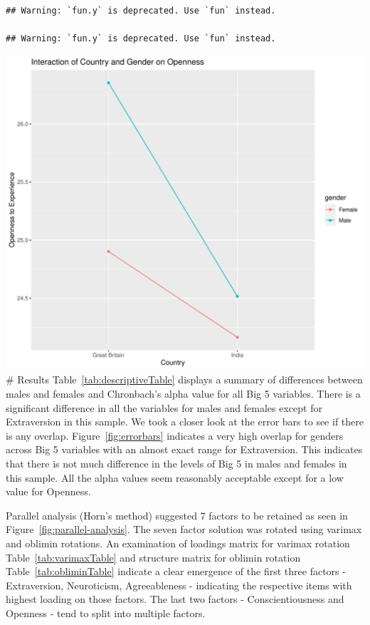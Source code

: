 \documentclass[
  english,
  man]{apa6}
\begin{document}
\begin{verbatim}
## Warning: `fun.y` is deprecated. Use `fun` instead.

## Warning: `fun.y` is deprecated. Use `fun` instead.
\end{verbatim}

\includegraphics{final_project_files/figure-latex/interaction_plot-1.pdf}
\# Results
Table~\ref{tab:descriptiveTable} displays a summary of differences between males and females and Chronbach's alpha value for all Big 5 variables. There is a significant difference in all the variables for males and females except for Extraversion in this sample. We took a closer look at the error bars to see if there is any overlap. Figure~\ref{fig:errorbars} indicates a very high overlap for genders across Big 5 variables with an almost exact range for Extraversion. This indicates that there is not much difference in the levels of Big 5 in males and females in this sample. All the alpha values seem reasonably acceptable except for a low value for Openness.

Parallel analysis (Horn's method) suggested 7 factors to be retained as seen in Figure~\ref{fig:parallel-analysis}. The seven factor solution was rotated using varimax and oblimin rotations. An examination of loadings matrix for varimax rotation Table~\ref{tab:varimaxTable} and structure matrix for oblimin rotation Table~\ref{tab:obliminTable} indicate a clear emergence of the first three factors -Extraversion, Neuroticism, Agreeableness - indicating the respective items with highest loading on those factors. The last two factors - Conscientiousness and Openness - tend to split into multiple factors.
\end{document}
